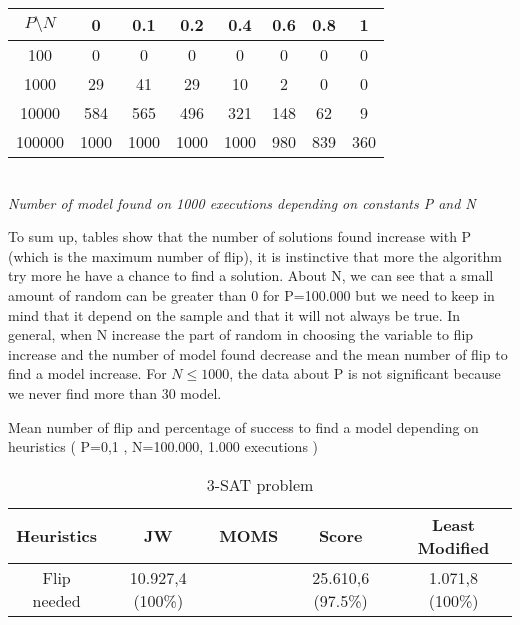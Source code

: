 \documentclass[a4paper]{article}
\begin{document}
\begin{table}[h!]
\begin{center}
\begin{tabular}{c||c c c c c c c}
         	$P \setminus N$ & 0  & 0.1  & 0.2  & 0.4  & 0.6 & 0.8 & 1  \\
        	\hline
        	\hline
     	    100 &  0   &   0   & 0     &  0   &  0  & 0   & 0  \\
     	   1000 & 29   &  41   & 29    & 10   & 2   & 0   & 0  \\
    	  10000 & 584  & 565   & 496   & 321  & 148 & 62  & 9  \\
    	 100000 & 1000 & 1000  & 1000  & 1000 & 980 & 839 & 360  \\
      	\end{tabular}\\
      	\textit{Number of model found on 1000 executions depending on constants P and N}
\end{center}
\end{table}

To sum up, tables show that the number of solutions found increase with P (which is the maximum number of flip), it is instinctive that more the algorithm try more he have a chance to find a solution. About N, we can see that a small amount of random can be greater than 0 for P=100.000 but we need to keep in mind that it depend on the sample and that it will not always be true. In general, when N increase the part of random in choosing the variable to flip increase and the number of model found decrease and the mean number of flip to find a model increase. For $ N \leq 1000 $, the data about P is  not significant because we never find more than 30 model.

\begin{center}
Mean number of flip and percentage of success to find a model depending on heuristics ( P=0,1 , N=100.000, 1.000 executions )
\end{center}

\begin{table}[h!]
\begin{center}
\begin{tabular}{c||c c c c}
         Heuristics & JW  & MOMS  & Score  & Least Modified  \\
        \hline
        \hline
         Flip needed & 10.927,4 (100\%)  & \cellcolor[gray]{0.5} & 25.610,6 (97.5\%) & 1.071,8 (100\%)\\

\end{tabular}
\caption{3-SAT problem}
\end{center}
\end{table}
\end{document}
